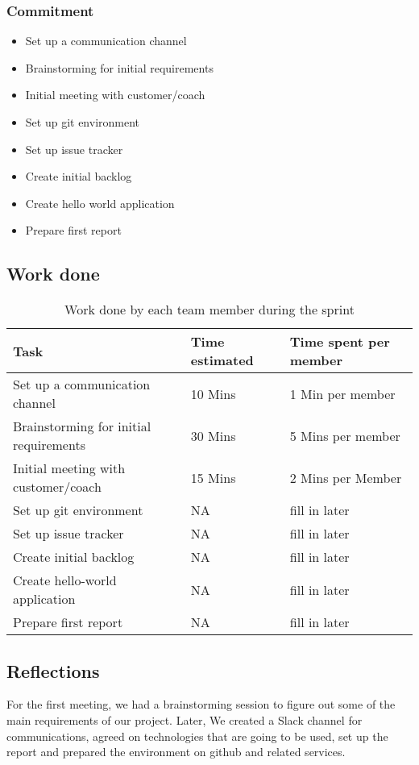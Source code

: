 \documentclass[14]{article}
\begin{document}
\subsubsection{Commitment}
\begin{itemize}
    \item Set up a communication channel
    \item Brainstorming for initial requirements
    \item Initial meeting with customer/coach
    \item Set up git environment
    \item Set up issue tracker
    \item Create initial backlog
    \item Create hello world application
    \item Prepare first report
\end{itemize}
\subsection{Work done}
\begin{table}[H]
    \centering
    \begin{tabular}{l|l|l|}
        \textbf{Task} & \textbf{Time estimated} & \textbf{Time spent per member}  \\
        \hline
        Set up a communication channel & 10 Mins & 1 Min per member \\
        Brainstorming for initial requirements & 30 Mins & 5 Mins per member\\
        Initial meeting with customer/coach & 15 Mins & 2 Mins per Member \\
        Set up git environment & NA & fill in later  \\
        Set up issue tracker & NA & fill in later \\
        Create initial backlog & NA & fill in later  \\
        Create hello-world application & NA & fill in later  \\
        Prepare first report & NA & fill in later \\
    \end{tabular}
    \caption{Work done by each team member during the sprint}
    \label{tab:my_label}
\end{table}


\subsection{Reflections}
For the first meeting, we had a brainstorming session to figure out some of the main requirements of our project. Later, We created a Slack channel for communications, agreed on technologies that are going to be used, set up the report and prepared the environment on github and related services.
\end{document}
